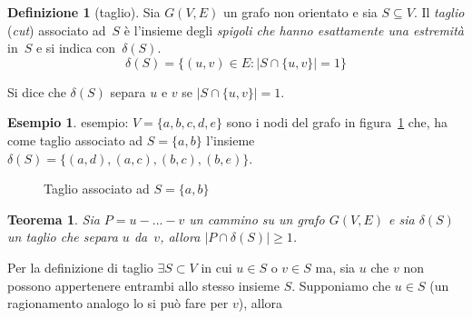 \documentclass[a4paper, oneside, openany]{book}
\theoremstyle{plain}
\newtheorem{thm}{Teorema}[section]
\theoremstyle{definition}
\newtheorem{defn}{Definizione}[chapter]
\newtheorem{ese}{Esempio}[section]
\begin{document}
\begin{defn}[taglio]
Sia ${G(V,E)}$ un grafo non orientato e sia ${S \subseteq V}$. Il \emph{taglio} (\emph{cut})
associato ad~$S$ è l'insieme degli \emph{spigoli che hanno esattamente una estremità} 
in~$S$ e si indica con~$\delta(S)$.
\[ \delta(S) = \{(u,v) \in E \colon | S \cap \{u,v\} | = 1 \} \]
\end{defn}
Si dice che $\delta(S)$ separa $u$ e $v$ se ${|S \cap \{u,v\}| = 1}$.

\begin{ese}
esempio: ${V=\{a,b,c,d,e\}}$ sono i nodi del grafo in figura~\ref{fig:es_taglio} che, ha come
taglio associato ad ${S = \{a, b\}}$ l'insieme ${\delta(S)= \{(a,d),(a,c),(b,c),(b,e)\}}$.
    \begin{figure}
        \centering
        \caption{Taglio associato ad $S = \{ a, b \}$} 
        \label{fig:es_taglio}
    \end{figure}
\end{ese}

\begin{thm}
Sia ${P = u - \dots - v}$ un cammino su un grafo ${G(V,E)}$ e sia $\delta(S)$ un taglio che
separa $u$ da~$v$, allora ${ |P \cap \delta(S)| \geqslant 1 }$. 
\label{thm:taglio_cammino}
\end{thm}
\proof
Per la definizione di taglio ${\exists S \subset V}$ in cui ${u \in S}$ o ${v \in S}$ ma,
sia $u$ che $v$ non possono appertenere entrambi allo stesso insieme $S$. Supponiamo che
${u \in S}$ (un ragionamento analogo lo si può fare per $v$), allora 
\endproof
\end{document}
